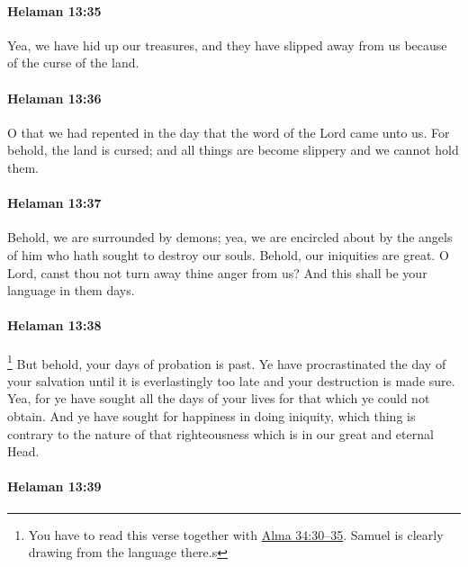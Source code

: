 		\paragraph{Helaman 13:35} %
			\label{HELAMAN-13-35}

			Yea, we have hid up our treasures,
			and they have slipped away from us because of the curse of the land.

		\paragraph{Helaman 13:36} %
			\label{HELAMAN-13-36}

			O that we had repented in the day that the word of the Lord came unto us.
			For behold, the land is cursed;
			and all things are become slippery and we cannot hold them.

		\paragraph{Helaman 13:37} %
			\label{HELAMAN-13-37}

			Behold, we are surrounded by demons;
			yea, we are encircled about by the angels of him
			who hath sought to destroy our souls.
			Behold, our iniquities are great.
			O Lord, canst thou not turn away thine anger from us?
			And this shall be your language in them days.

		\paragraph{Helaman 13:38} %
			\label{HELAMAN-13-38}

				\footnote{%
					You have to read this verse together with \hyperref[ALMA-34-30]{Alma 34:30--35}. Samuel is clearly drawing from the language there.s
					}%
			But behold, your days of probation is past.
			Ye have procrastinated the day of your salvation
			until it is everlastingly too late and your destruction is made sure.
			Yea, for ye have sought all the days of your lives
			for that which ye could not obtain.
			And ye have sought for happiness in doing iniquity,
			which thing is contrary to the nature of that righteousness
			which is in our great and eternal Head.

		\paragraph{Helaman 13:39} %
			\label{HELAMAN-13-39}

